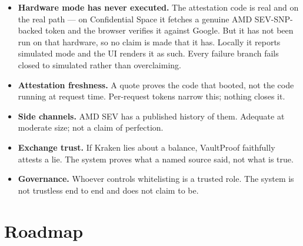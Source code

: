 \documentclass[11pt,a4paper]{article}
\newcommand{\ProjectName}{VaultProof}
\begin{document}
\begin{itemize}[leftmargin=1.2em, itemsep=0.45em]
  \item \textbf{Hardware mode has never executed.} The attestation code is real
        and on the real path --- on Confidential Space it fetches a genuine
        AMD SEV-SNP-backed token and the browser verifies it against Google.
        But it has not been run on that hardware, so no claim is made that it
        has. Locally it reports simulated mode and the UI renders it as such.
        Every failure branch fails closed to simulated rather than
        overclaiming.

  \item \textbf{Attestation freshness.} A quote proves the code that booted,
        not the code running at request time. Per-request tokens narrow this;
        nothing closes it.

  \item \textbf{Side channels.} AMD SEV has a published history of them.
        Adequate at moderate size; not a claim of perfection.

  \item \textbf{Exchange trust.} If Kraken lies about a balance, \ProjectName{}
        faithfully attests a lie. The system proves what a named source said,
        not what is true.

  \item \textbf{Governance.} Whoever controls whitelisting is a trusted role.
        The system is not trustless end to end and does not claim to be.
\end{itemize}

\section{Roadmap}
\end{document}
